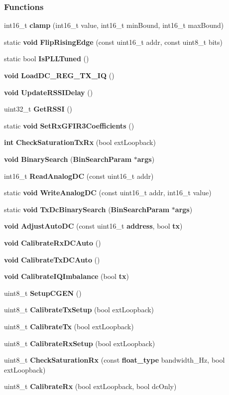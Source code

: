 \subsubsection*{Functions}
\begin{DoxyCompactItemize}
\item 
int16\+\_\+t {\bf clamp} (int16\+\_\+t value, int16\+\_\+t min\+Bound, int16\+\_\+t max\+Bound)
\item 
static {\bf void} {\bf Flip\+Rising\+Edge} (const uint16\+\_\+t addr, const uint8\+\_\+t bits)
\item 
static bool {\bf Is\+P\+L\+L\+Tuned} ()
\item 
{\bf void} {\bf Load\+D\+C\+\_\+\+R\+E\+G\+\_\+\+T\+X\+\_\+\+IQ} ()
\item 
{\bf void} {\bf Update\+R\+S\+S\+I\+Delay} ()
\item 
uint32\+\_\+t {\bf Get\+R\+S\+SI} ()
\item 
static {\bf void} {\bf Set\+Rx\+G\+F\+I\+R3\+Coefficients} ()
\item 
{\bf int} {\bf Check\+Saturation\+Tx\+Rx} (bool ext\+Loopback)
\item 
{\bf void} {\bf Binary\+Search} ({\bf Bin\+Search\+Param} $\ast${\bf args})
\item 
int16\+\_\+t {\bf Read\+Analog\+DC} (const uint16\+\_\+t addr)
\item 
static {\bf void} {\bf Write\+Analog\+DC} (const uint16\+\_\+t addr, int16\+\_\+t value)
\item 
static {\bf void} {\bf Tx\+Dc\+Binary\+Search} ({\bf Bin\+Search\+Param} $\ast${\bf args})
\item 
{\bf void} {\bf Adjust\+Auto\+DC} (const uint16\+\_\+t {\bf address}, bool {\bf tx})
\item 
{\bf void} {\bf Calibrate\+Rx\+D\+C\+Auto} ()
\item 
{\bf void} {\bf Calibrate\+Tx\+D\+C\+Auto} ()
\item 
{\bf void} {\bf Calibrate\+I\+Q\+Imbalance} (bool {\bf tx})
\item 
uint8\+\_\+t {\bf Setup\+C\+G\+EN} ()
\item 
uint8\+\_\+t {\bf Calibrate\+Tx\+Setup} (bool ext\+Loopback)
\item 
uint8\+\_\+t {\bf Calibrate\+Tx} (bool ext\+Loopback)
\item 
uint8\+\_\+t {\bf Calibrate\+Rx\+Setup} (bool ext\+Loopback)
\item 
uint8\+\_\+t {\bf Check\+Saturation\+Rx} (const {\bf float\+\_\+type} bandwidth\+\_\+\+Hz, bool ext\+Loopback)
\item 
uint8\+\_\+t {\bf Calibrate\+Rx} (bool ext\+Loopback, bool dc\+Only)
\end{DoxyCompactItemize}

